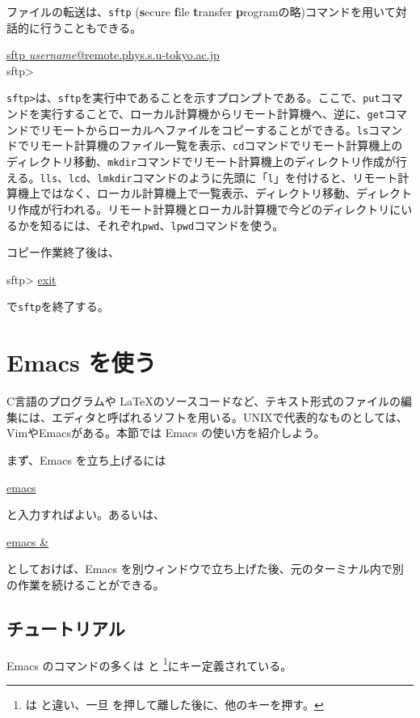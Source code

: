 ファイルの転送は、\texttt{sftp} (\textbf{s}ecure \textbf{f}ile \textbf{t}ransfer \textbf{p}rogramの略)コマンドを用いて対話的に行うこともできる。
\begin{commandline2}
    \prompt \underline{sftp \textit{username}@remote.phys.s.u-tokyo.ac.jp} \\
    sftp>
\end{commandline2} \noindent
\texttt{sftp>}は、\texttt{sftp}を実行中であることを示すプロンプトである。ここで、\texttt{put}コマンドを実行することで、ローカル計算機からリモート計算機へ、逆に、\texttt{get}コマンドでリモートからローカルへファイルをコピーすることができる。\texttt{ls}コマンドでリモート計算機のファイル一覧を表示、\texttt{cd}コマンドでリモート計算機上のディレクトリ移動、\texttt{mkdir}コマンドでリモート計算機上のディレクトリ作成が行える。\texttt{lls}、\texttt{lcd}、\texttt{lmkdir}コマンドのように先頭に「\texttt{l}」を付けると、リモート計算機上ではなく、ローカル計算機上で一覧表示、ディレクトリ移動、ディレクトリ作成が行われる。リモート計算機とローカル計算機で今どのディレクトリにいるかを知るには、それぞれ\texttt{pwd}、\texttt{lpwd}コマンドを使う。

コピー作業終了後は、
\begin{commandline2}
    sftp> \underline{exit}
\end{commandline2} \noindent
で\texttt{sftp}を終了する。

\section{Emacs を使う}

C言語のプログラムや \LaTeX のソースコードなど、テキスト形式のファイルの編集には、エディタと呼ばれるソフトを用いる。UNIXで代表的なものとしては、VimやEmacsがある。本節では Emacs の使い方を紹介しよう。

まず、Emacs を立ち上げるには
\begin{commandline2}
    \prompt \underline{emacs}
\end{commandline2} \noindent
と入力すればよい。あるいは、
\begin{commandline2}
    \prompt \underline{emacs \&}
\end{commandline2} \noindent
としておけば、Emacs を別ウィンドウで立ち上げた後、元のターミナル内で別の作業を続けることができる。
\subsection{チュートリアル}
Emacs のコマンドの多くは
 と \footnote{ は  と違い、一旦  を押して離した後に、他のキーを押す。}にキー定義されている。

